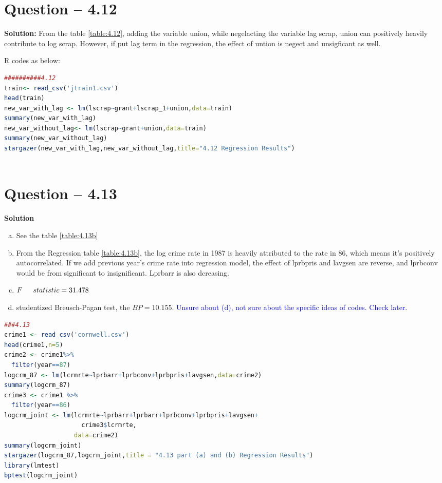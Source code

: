 \documentclass[11pt]{article} %
\begin{document}
\section{Question -- 4.12}
\textbf{Solution:}
From the table \ref{table:4.12}, adding the variable union, while negelacting the variable lag scrap, union can positively heavily contribute to log scrap. However, if put lag term in 
the regression, the effect of untion is negect and unsigficant as well. 

R codes as below:
\begin{lstlisting}[language=R]
    ##########4.12 
train<- read_csv('jtrain1.csv')
head(train)
new_var_with_lag <- lm(lscrap~grant+lscrap_1+union,data=train)
summary(new_var_with_lag)
new_var_without_lag<- lm(lscrap~grant+union,data=train)
summary(new_var_without_lag)
stargazer(new_var_with_lag,new_var_without_lag,title="4.12 Regression Results")
    
\end{lstlisting}

\section{Question -- 4.13}
\textbf{Solution}
\begin{enumerate}[a)]
    \item See the table \ref{table:4.13b}
    \item From the Regression table \ref{table:4.13b}, the log crime rate in 1987 is heavily attributed to the rate in 86, which means it's positively autocorrelated. If we 
          add previous year's crime rate into regression model, the effect of lprbpris and lavgsen are reverse, and lprbconv would be from significant to insignificant. Lprbarr is also dcreasing.
    \item $F \indent statistic=31.478$
    \item studentized Breusch-Pagan test, the $BP=10.155$. 
     \textcolor{blue}{Unsure about (d), not sure about the specific ideas of codes. Check later.}
\end{enumerate}
\begin{lstlisting}[language=R]
    ###4.13
crime1 <- read_csv('cornwell.csv')
head(crime1,n=5)
crime2 <- crime1%>%
  filter(year==87)
logcrm_87 <- lm(lcrmrte~lprbarr+lprbconv+lprbpris+lavgsen,data=crime2)
summary(logcrm_87)
crime3 <- crime1 %>%
  filter(year==86)
logcrm_joint <- lm(lcrmrte~lprbarr+lprbarr+lprbconv+lprbpris+lavgsen+
                     crime3$lcrmrte,
                   data=crime2)
summary(logcrm_joint)
stargazer(logcrm_87,logcrm_joint,title = "4.13 part (a) and (b) Regression Results")
library(lmtest)
bptest(logcrm_joint)
\end{lstlisting}
\end{document}
